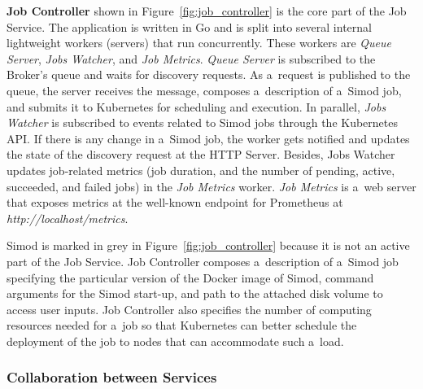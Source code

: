 \documentclass[12pt]{article}
\begin{document}
\textbf{Job Controller} shown in Figure~\ref{fig:job_controller} is the core part of the Job Service. The application is written in Go and is split into several internal lightweight workers (servers) that run concurrently. These workers are \emph{Queue Server}, \emph{Jobs Watcher}, and \emph{Job Metrics}. \emph{Queue Server} is subscribed to the Broker's queue and waits for discovery requests. As a~request is published to the queue, the server receives the message, composes a~description of a~Simod job, and submits it to Kubernetes for scheduling and execution. In parallel, \emph{Jobs Watcher} is subscribed to events related to Simod jobs through the Kubernetes API. If there is any change in a~Simod job, the worker gets notified and updates the state of the discovery request at the HTTP Server. Besides, Jobs Watcher updates job-related metrics (job duration, and the number of pending, active, succeeded, and failed jobs) in the \emph{Job Metrics} worker. \emph{Job Metrics} is a~web server that exposes metrics at the well-known endpoint for Prometheus at \emph{http://localhost/metrics}.

Simod is marked in grey in Figure~\ref{fig:job_controller} because it is not an active part of the Job Service. Job Controller composes a~description of a~Simod job specifying the particular version of the Docker image of Simod, command arguments for the Simod start-up, and path to the attached disk volume to access user inputs. Job Controller also specifies the number of computing resources needed for a~job so that Kubernetes can better schedule the deployment of the job to nodes that can accommodate such a~load.

\subsubsection{Collaboration between Services}
\end{document}
